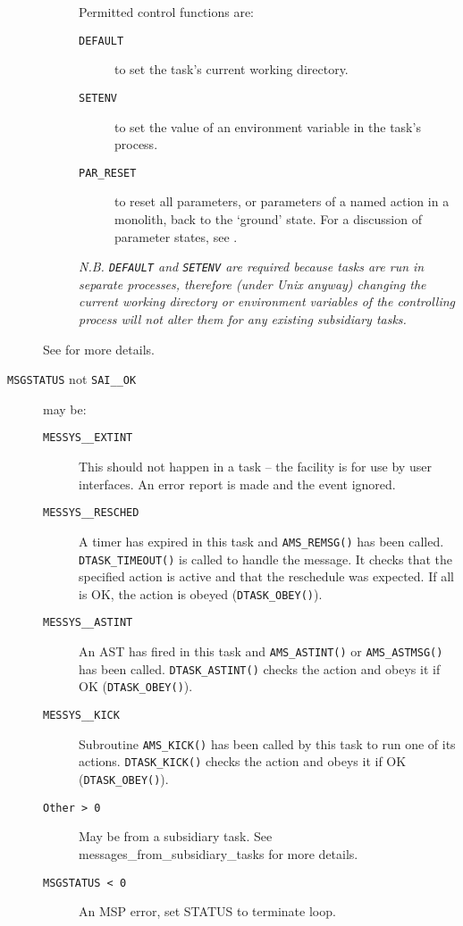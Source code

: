 \documentclass[twoside,11pt,nolof]{starlink}
\begin{document}
\begin{description}
\begin{description}
Permitted control functions are:
\begin{description}
\item[\texttt{DEFAULT}] to set the task's current working directory.
\item[\texttt{SETENV}] to set the value of an environment variable in the
task's process.
\item[\texttt{PAR\_RESET}] to reset all parameters, or parameters of a named
action in a monolith, back to the `ground' state.
For a discussion of parameter states, see
.
\end{description}
\emph{N.B. \texttt{DEFAULT} and \texttt{SETENV} are required because tasks are
run in separate processes, therefore (under Unix anyway) changing the current
working directory or environment variables of the controlling process will
not alter them for any existing subsidiary tasks.}
\end{description}
See
for more details.
\item[\texttt{MSGSTATUS} not \texttt{SAI\_\_OK}] may be:
\begin{description}
\item[\texttt{MESSYS\_\_EXTINT}] This should not happen in a task -- the
facility is for use by user interfaces.
An error report is made and the event ignored.
\item[\texttt{MESSYS\_\_RESCHED}]   A timer has expired in this task and
\texttt{AMS\_REMSG()} has been called. \texttt{DTASK\_TIMEOUT()} is called
to handle the message. It checks that the specified action is active and that
the reschedule was expected. If all is OK, the action is obeyed
(\texttt{DTASK\_OBEY()}).
\item[\texttt{MESSYS\_\_ASTINT}]  An AST has fired in this task and
\texttt{AMS\_ASTINT()} or \texttt{AMS\_ASTMSG()} has been called.
\texttt{DTASK\_ASTINT()} checks the action and obeys it if OK
(\texttt{DTASK\_OBEY()}).
\item[\texttt{MESSYS\_\_KICK}] Subroutine \texttt{AMS\_KICK()} has been
called by this task to run one of its actions. \texttt{DTASK\_KICK()} checks
the action and obeys it if OK (\texttt{DTASK\_OBEY()}).
\item[\texttt{Other > 0}]   May be from a subsidiary task.
See
{messages_from_subsidiary_tasks} for more details.
\item[\texttt{MSGSTATUS < 0}]  An MSP error, set STATUS to terminate loop.
\end{description}
\end{description}
\end{document}
